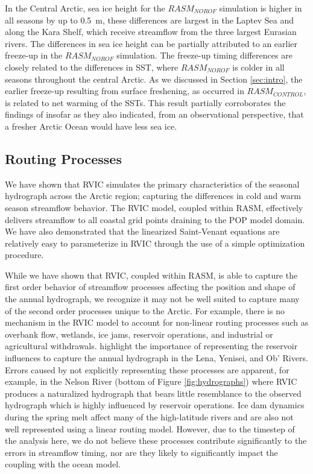 \documentclass[jgrga, draft]{agutex}
\begin{document}
\begin{article}
In the Central Arctic, sea ice height for the $RASM_{NOROF}$ simulation is higher in all seasons by up to 0.5~m, these differences are largest in the Laptev Sea and along the Kara Shelf, which receive streamflow from the three largest Eurasian rivers.
The differences in sea ice height can be partially attributed to an earlier freeze-up in the $RASM_{NOROF}$ simulation.
The freeze-up timing differences are closely related to the differences in SST, where $RASM_{NOROF}$ is colder in all seasons throughout the central Arctic.
As we discussed in Section \ref{sec:intro}, the earlier freeze-up resulting from surface freshening, as occurred in $RASM_{CONTROL}$, is related to net warming of the SSTs. %
This result partially corroborates the findings of \citep{Morison_2012} insofar as they also indicated, from an observational perspective, that a fresher Arctic Ocean would have less sea ice. %

\subsection{Routing Processes}

We have shown that RVIC simulates the primary characteristics of the seasonal hydrograph across the Arctic region; capturing the differences in cold and warm season streamflow behavior.
The RVIC model, coupled within RASM, effectively delivers streamflow to all coastal grid points draining to the POP model domain.
We have also demonstrated that the linearized Saint-Venant equations are relatively easy to parameterize in RVIC through the use of a simple optimization procedure.

While we have shown that RVIC, coupled within RASM, is able to capture the first order behavior of streamflow processes affecting the position and shape of the annual hydrograph, we recognize it may not be well suited to capture many of the second order processes unique to the Arctic.
For example, there is no mechanism in the RVIC model to account for non-linear routing processes such as overbank flow, wetlands, ice jams, reservoir operations, and industrial or agricultural withdrawals.
\citet{Adam_2007} highlight the importance of representing the reservoir influences to capture the annual hydrograph in the Lena, Yenisei, and Ob' Rivers.
Errors caused by not explicitly representing these processes are apparent, for example, in the Nelson River (bottom of Figure \ref{fig:hydrographs}) where RVIC produces a naturalized hydrograph that bears little resemblance to the observed hydrograph which is highly influenced by reservoir operations.
Ice dam dynamics during the spring melt affect many of the high-latitude rivers and are also not well represented using a linear routing model.
However, due to the timestep of the analysis here, we do not believe these processes contribute significantly to the errors in streamflow timing, nor are they likely to significantly impact the coupling with the ocean model.


\end{article}
\end{document}
